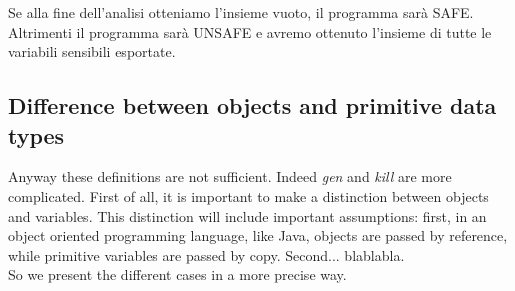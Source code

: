 \documentclass[letterpaper,twocolumn,10pt]{article}
\begin{document}
Se alla fine dell'analisi otteniamo l'insieme vuoto, il programma sar\`a SAFE. Altrimenti il programma sar\`a UNSAFE e avremo ottenuto l'insieme di tutte le variabili sensibili esportate.\\

\subsection{Difference between objects and primitive data types}
Anyway these definitions are not sufficient. Indeed \emph{gen} and \emph{kill} are more complicated. First of all, it is important to make a distinction between objects and variables. This distinction will include important assumptions: first, in an object oriented programming language, like Java, objects are passed by reference, while primitive variables are passed by copy. Second... blablabla. \\
So we present the different cases in a more precise way.\\
\end{document}
